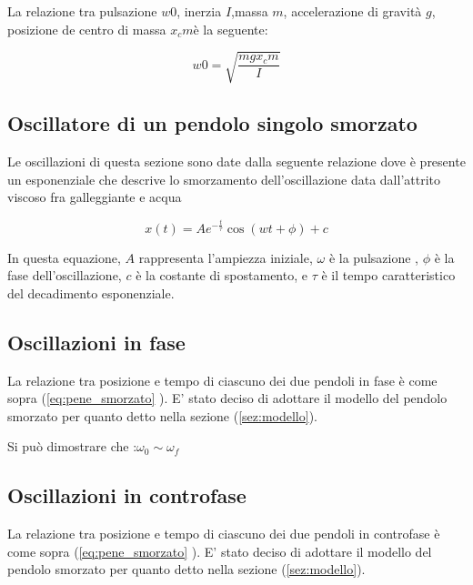 \documentclass{article}
\begin{document}
            La relazione tra pulsazione $w0$,  inerzia $I$,massa $m$, accelerazione di gravità $g$, posizione de centro di massa $x_cm$è la seguente:
            
\begin{equation}
w0 = \sqrt{\frac{m g x_cm}{I}}
\label{eq:w0_teoria}
\end{equation}                    
        
                    
		\subsection{  Oscillatore di un pendolo singolo smorzato }
              Le oscillazioni di questa sezione sono date dalla seguente relazione dove è presente un esponenziale che descrive lo smorzamento dell'oscillazione data dall'attrito viscoso fra galleggiante e acqua
                    
\begin{equation}
x(t) = A e^{-\frac{t}{\tau}} \cos(w  t + \phi) + c                     
\label{eq:pene_smorzato}
\end{equation} 

In questa equazione,  $A$  rappresenta l'ampiezza iniziale, $\omega$  è la pulsazione , $\phi$  è la fase dell'oscillazione, $c$  è la costante di spostamento, e $\tau$  è il tempo caratteristico del decadimento esponenziale.
                    
		\subsection{  Oscillazioni in fase}
                La relazione tra posizione e tempo di ciascuno dei due pendoli in fase è come sopra (\ref{eq:pene_smorzato} ). E' stato deciso di adottare il modello del pendolo smorzato per quanto detto nella sezione (\ref{sez:modello}).
                
                Si può dimostrare che :$\omega_0 \sim \omega_f$
                                
		\subsection{  Oscillazioni in controfase}
                 La relazione tra posizione e tempo di ciascuno dei due pendoli in controfase è come sopra (\ref{eq:pene_smorzato} ).	 E' stato deciso di adottare il modello del pendolo smorzato per quanto detto nella sezione (\ref{sez:modello}).
\end{document}
